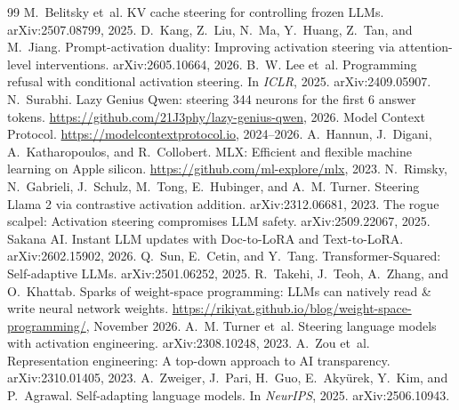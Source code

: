 \begin{thebibliography}{99}\small
{} M.~Belitsky et~al. KV cache steering for controlling frozen LLMs. arXiv:2507.08799, 2025.
 D.~Kang, Z.~Liu, N.~Ma, Y.~Huang, Z.~Tan, and M.~Jiang. Prompt-activation duality: Improving activation steering via attention-level interventions. arXiv:2605.10664, 2026.
 B.~W. Lee et~al. Programming refusal with conditional activation steering. In \emph{ICLR}, 2025. arXiv:2409.05907.
 N.~Surabhi. Lazy Genius Qwen: steering 344 neurons for the first 6 answer tokens. \url{https://github.com/21J3phy/lazy-genius-qwen}, 2026.
 Model Context Protocol. \url{https://modelcontextprotocol.io}, 2024--2026.
 A.~Hannun, J.~Digani, A.~Katharopoulos, and R.~Collobert. MLX: Efficient and flexible machine learning on Apple silicon. \url{https://github.com/ml-explore/mlx}, 2023.
 N.~Rimsky, N.~Gabrieli, J.~Schulz, M.~Tong, E.~Hubinger, and A.~M. Turner. Steering Llama 2 via contrastive activation addition. arXiv:2312.06681, 2023.
 The rogue scalpel: Activation steering compromises LLM safety. arXiv:2509.22067, 2025.
 Sakana AI. Instant LLM updates with Doc-to-LoRA and Text-to-LoRA. arXiv:2602.15902, 2026.
 Q.~Sun, E.~Cetin, and Y.~Tang. Transformer-Squared: Self-adaptive LLMs. arXiv:2501.06252, 2025.
 R.~Takehi, J.~Teoh, A.~Zhang, and O.~Khattab. Sparks of weight-space programming: LLMs can natively read \& write neural network weights. \url{https://rikiyat.github.io/blog/weight-space-programming/}, November 2026.
 A.~M. Turner et~al. Steering language models with activation engineering. arXiv:2308.10248, 2023.
 A.~Zou et~al. Representation engineering: A top-down approach to AI transparency. arXiv:2310.01405, 2023.
 A.~Zweiger, J.~Pari, H.~Guo, E.~Aky\"urek, Y.~Kim, and P.~Agrawal. Self-adapting language models. In \emph{NeurIPS}, 2025. arXiv:2506.10943.
\end{thebibliography}
